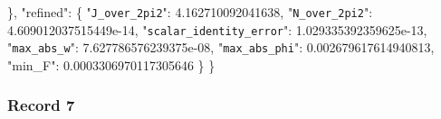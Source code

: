 \documentclass[
  10pt,
]{article}
\newenvironment{Shaded}{}{}
\newcommand{\DataTypeTok}[1]{\textcolor[rgb]{0.56,0.13,0.00}{#1}}
\newcommand{\FloatTok}[1]{\textcolor[rgb]{0.25,0.63,0.44}{#1}}
\newcommand{\FunctionTok}[1]{\textcolor[rgb]{0.02,0.16,0.49}{#1}}
\begin{document}
\begin{Shaded}
\begin{Highlighting}[]
  \FunctionTok{\},}
  \DataTypeTok{"refined"}\FunctionTok{:} \FunctionTok{\{}
    \DataTypeTok{"\nolinkurl{J_over_2pi2}"}\FunctionTok{:} \FloatTok{4.162710092041638}\FunctionTok{,}
    \DataTypeTok{"\nolinkurl{N_over_2pi2}"}\FunctionTok{:} \FloatTok{4.609012037515449e{-}14}\FunctionTok{,}
    \DataTypeTok{"\nolinkurl{scalar_identity_error}"}\FunctionTok{:} \FloatTok{1.029335392359625e{-}13}\FunctionTok{,}
    \DataTypeTok{"\nolinkurl{max_abs_w}"}\FunctionTok{:} \FloatTok{7.627786576239375e{-}08}\FunctionTok{,}
    \DataTypeTok{"\nolinkurl{max_abs_phi}"}\FunctionTok{:} \FloatTok{0.002679617614940813}\FunctionTok{,}
    \DataTypeTok{"min\_F"}\FunctionTok{:} \FloatTok{0.0003306970117305646}
  \FunctionTok{\}}
\FunctionTok{\}}
\end{Highlighting}
\end{Shaded}

\hypertarget{record-7}{%
\subsubsection{Record 7}\label{record-7}}
\end{document}
